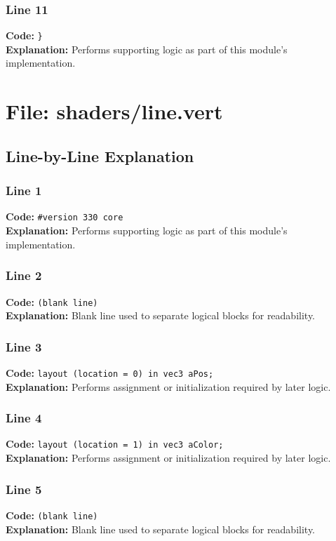 \documentclass[11pt,a4paper]{article}
\begin{document}
\subsubsection*{Line 11}
\textbf{Code:} \verb|}|\\
\textbf{Explanation:} Performs supporting logic as part of this module's implementation.

\newpage
\section{File: shaders/line.vert}
\subsection{Line-by-Line Explanation}
\subsubsection*{Line 1}
\textbf{Code:} \verb|#version 330 core|\\
\textbf{Explanation:} Performs supporting logic as part of this module's implementation.

\subsubsection*{Line 2}
\textbf{Code:} \texttt{(blank line)}\\
\textbf{Explanation:} Blank line used to separate logical blocks for readability.

\subsubsection*{Line 3}
\textbf{Code:} \verb|layout (location = 0) in vec3 aPos;|\\
\textbf{Explanation:} Performs assignment or initialization required by later logic.

\subsubsection*{Line 4}
\textbf{Code:} \verb|layout (location = 1) in vec3 aColor;|\\
\textbf{Explanation:} Performs assignment or initialization required by later logic.

\subsubsection*{Line 5}
\textbf{Code:} \texttt{(blank line)}\\
\textbf{Explanation:} Blank line used to separate logical blocks for readability.
\end{document}
